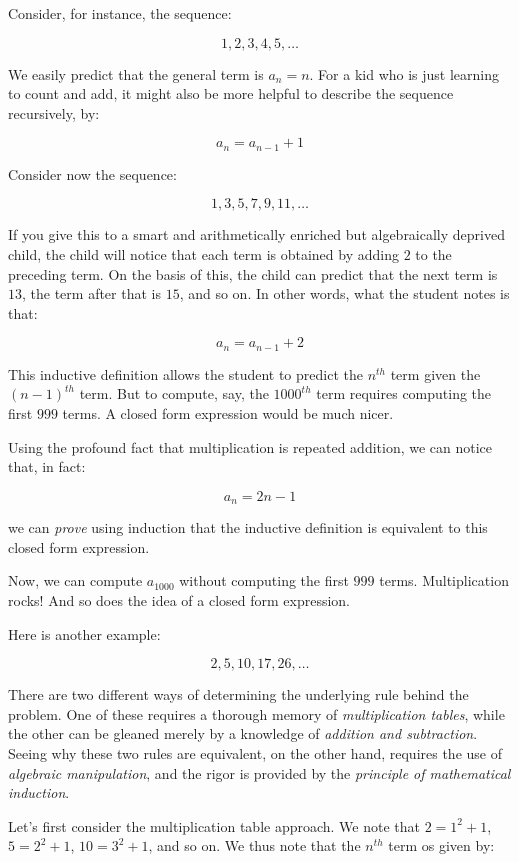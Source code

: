 \documentclass{amsart}
\begin{document}
Consider, for instance, the sequence:

$$1,2,3,4,5,\dots$$

We easily predict that the general term is $a_n = n$. For a kid who is
just learning to count and add, it might also be more helpful to
describe the sequence recursively, by:

$$a_n = a_{n-1} + 1$$

Consider now the sequence:

$$1,3,5,7,9,11,\dots$$

If you give this to a smart and arithmetically enriched but
algebraically deprived child, the child will notice that each term is
obtained by adding $2$ to the preceding term. On the basis of this,
the child can predict that the next term is $13$, the term after that
is $15$, and so on. In other words, what the student notes is that:

$$a_n = a_{n-1} + 2$$

This inductive definition allows the student to predict the $n^{th}$
term given the $(n-1)^{th}$ term. But to compute, say, the $1000^{th}$
term requires computing the first $999$ terms. A closed form
expression would be much nicer.

Using the profound fact that multiplication is repeated addition, we
can notice that, in fact:

$$a_n = 2n - 1$$

we can {\em prove} using induction that the inductive definition is
equivalent to this closed form expression.

Now, we can compute $a_{1000}$ without computing the first $999$
terms. Multiplication rocks! And so does the idea of a closed form
expression.

Here is another example:

$$2,5,10,17,26,\dots$$

There are two different ways of determining the underlying rule behind
the problem. One of these requires a thorough memory of {\em
multiplication tables}, while the other can be gleaned merely by a
knowledge of {\em addition and subtraction}. Seeing why these two
rules are equivalent, on the other hand, requires the use of {\em
algebraic manipulation}, and the rigor is provided by the {\em
principle of mathematical induction}.

Let's first consider the multiplication table approach. We note that
$2 = 1^2 + 1$, $5 = 2^2 + 1$, $10 = 3^2 + 1$, and so on. We thus note
that the $n^{th}$ term os given by:
\end{document}
